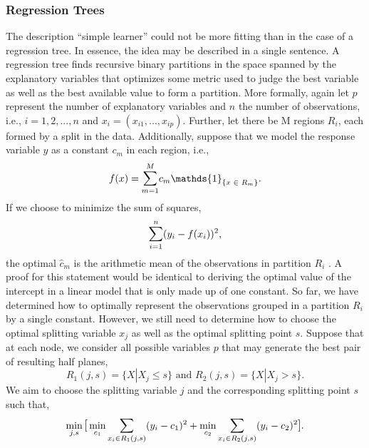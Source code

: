 \documentclass[a4paper,12pt, headsepline]{scrartcl}
\DeclareMathOperator*{\minA}{min}
\numberwithin{equation}{section}
\begin{document}
\subsubsection{Regression Trees}\label{subsubsec:trees}
The description \enquote{simple learner} could not be more fitting than in the case of a regression tree. In essence, the idea may be described in a single sentence. A regression tree finds recursive binary partitions in the space spanned by the explanatory variables that optimizes some metric used to judge the best variable as well as the best available value to form a partition. More formally, again let $p$ represent the number of explanatory variables and $n$ the number of observations, i.e., $i = 1, 2, ..., n$ and $x_i = (x_{i1}, ..., x_{ip})$. Further, let there be M regions $R_i$, each formed by a split in the data. Additionally, suppose that we model the response variable $y$ as a constant $c_m$ in each region, i.e.,
\[
f(x) = \mathlarger{\sum}\limits_{m = 1}^{M} c_m \mathds{1}_{\{x \text{ } \in \text{ } R_m\}}.
\]
If we choose to minimize the sum of squares, 
\[
\mathlarger{\sum}\limits_{i = 1}^{n}(y_i - f(x_i))^2,
\]
the optimal $\hat c_m$ is the arithmetic mean of the observations in partition $R_i$ \citep{hastie09}. A proof for this statement would be identical to deriving the optimal value of the intercept in a linear model that is only made up of one constant. So far, we have determined how to optimally represent the observations grouped in a partition $R_i$ by a single constant. However, we still need to determine how to choose the optimal splitting variable $x_j$ as well as the optimal splitting point $s$. Suppose that at each node, we consider all possible variables $p$ that may generate the best pair of resulting half planes,
\[
R_1(j, s) = \{X|X_j \leq s\} \text{ and } R_2(j, s) = \{X|X_j > s\}.
\]
We aim to choose the splitting variable $j$ and the corresponding splitting point $s$ such that,
\[
\minA_{j, s}\mathlarger{[} \minA_{c_1} \mathlarger{\sum}\limits_{x_i \in R_1(j, s)} (y_i - c_1)^2 + \minA_{c_2} \mathlarger{\sum}\limits_{x_i \in R_2(j, s)} (y_i - c_2)^2 \mathlarger{]}.
\]
\end{document}
